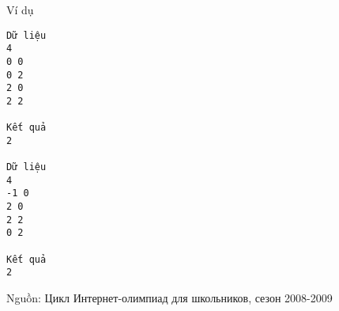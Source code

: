 Ví dụ  
\begin{verbatim}
Dữ liệu
4
0 0
0 2
2 0
2 2

Kết quả
2

Dữ liệu
4
-1 0
2 0
2 2
0 2

Kết quả
2
\end{verbatim}

   Nguồn: Цикл Интернет-олимпиад для школьников, сезон 2008-2009